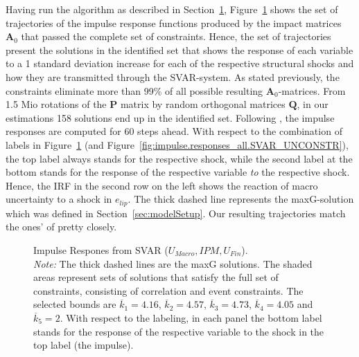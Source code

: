 \documentclass[a4paper,11pt,listof=nochaptergap,oneside,pointednumbers,bibtotoc,bigheadings,liststotoc,hidelinks]{scrbook}
\theoremstyle{mysatz}
\theoremstyle{mydefinition}
\theoremstyle{mytheorem}
\theoremstyle{mybemerkung}
\newcommand{\vect}[1]{\boldsymbol{\mathbf{#1}}}
\begin{document}
Having run the algorithm as described in Section~\ref{fig:impulse.responses_all.SVAR}, Figure~\ref{fig:impulse.responses_all.SVAR} shows the set of trajectories of the impulse response functions produced by the impact matrices $\vect{A}_0$ that passed the complete set of constraints. Hence, the set of trajectories present the solutions in the identified set that shows the response of each variable to a 1 standard deviation increase for each of the respective structural shocks and how they are transmitted through the SVAR-system. As stated previously, the constraints eliminate more than 99\% of all possible resulting $\vect{A}_0$-matrices. From 1.5 Mio rotations of the $\vect{P}$ matrix by random orthogonal matrices $\vect{Q}$, in our estimations 158 solutions end up in the identified set. Following \citet{ludvigsonetal:19}, the impulse responses are computed for 60 steps ahead. With respect to the combination of labels in Figure~\ref{fig:impulse.responses_all.SVAR} (and Figure~\ref{fig:impulse.responses_all.SVAR_UNCONSTR}), the top label always stands for the respective shock, while the second label at the bottom stands for the response of the respective variable \textit{to} the respective shock. Hence, the IRF in the second row on the left shows the reaction of macro uncertainty to a shock in $e_{lip}$. The thick dashed line represents the maxG-solution which was defined in Section~\ref{sec:modelSetup}. Our resulting trajectories match the ones' of \citet{ludvigsonetal:19} pretty closely. 


\begin{figure}[!h]
   \centering
   \setlength\fboxsep{0pt}
   \setlength\fboxrule{0pt}
      \caption[Impulse Respones from SVAR ($U_{Macro}, IPM, U_{Fin}$).]{Impulse Respones from SVAR ($U_{Macro}, IPM, U_{Fin}$).\\
      \textit{Note:}  The thick dashed lines are the maxG solutions. The shaded areas represent sets of solutions that satisfy the full set of constraints, consisting of correlation and event constraints. The selected bounds are $\overline{k}_1 = 4.16$, $\overline{k}_2 = 4.57$, $\overline{k}_3 = 4.73$, $\overline{k}_4 = 4.05$ and $\overline{k}_5 = 2$. With respect to the labeling, in each panel the bottom label stands for the response of the respective variable to the shock in the top label (the impulse).}   \label{fig:impulse.responses_all.SVAR}
\end{figure}
\end{document}
